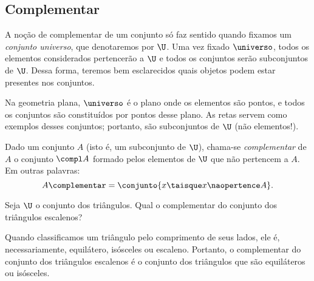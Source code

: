 \subsection{Complementar}
A noção de complementar de um conjunto só faz sentido quando fixamos um \emph{conjunto universo}, que denotaremos por $\U$. Uma vez fixado $\universo$, todos os elementos considerados pertencerão a $\U$ e todos os conjuntos serão subconjuntos de $\U$. Dessa forma, teremos bem esclarecidos quais objetos podem estar presentes nos conjuntos.

\begin{example}
	Na geometria plana, $\universo$ é o plano onde os elementos são pontos, e todos os conjuntos são constituídos por pontos desse plano. As retas servem como exemplos desses conjuntos; portanto, são subconjuntos de $\U$ (não elementos!).
\end{example}

\begin{definition}[Complementar]
	\label{def:complementar}
	Dado um conjunto $A$ (isto é, um subconjunto de $\U$), chama-se \emph{complementar} de $A$ o conjunto $\compl A$ formado pelos elementos de $\U$ que não pertencem a $A$.
	Em outras palavras:
	\[
		A\complementar = \conjunto{ x \taisque x \naopertence A}.
	\]
\end{definition}

\begin{example}
	Seja $\U$ o conjunto dos triângulos. Qual o complementar do conjunto dos triângulos escalenos?
\end{example}

\begin{solution}
	Quando classificamos um triângulo pelo comprimento de seus lados, ele é, necessariamente, equilátero, isósceles ou escaleno. Portanto, o complementar do conjunto dos triângulos escalenos é o conjunto dos triângulos que são equiláteros ou isósceles.
\end{solution}

